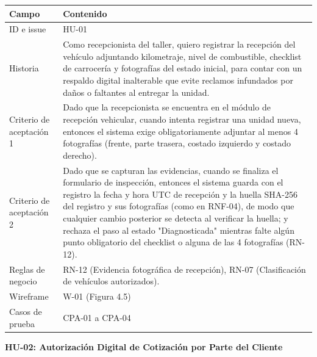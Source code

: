 {\def\LTcaptype{none} %
\begin{longtable}[]{@{}
  >{\raggedright\arraybackslash}p{}
  >{\raggedright\arraybackslash}p{}@{}}
\toprule\noalign{}
\begin{minipage}[b]{\linewidth}\raggedright
\textbf{Campo}
\end{minipage} & \begin{minipage}[b]{\linewidth}\raggedright
\textbf{Contenido}
\end{minipage} \\
\midrule\noalign{}
\endhead
\bottomrule\noalign{}
\endlastfoot
ID e issue & HU-01 \\
Historia & Como recepcionista del taller, quiero registrar la recepción
del vehículo adjuntando kilometraje, nivel de combustible, checklist de
carrocería y fotografías del estado inicial, para contar con un respaldo
digital inalterable que evite reclamos infundados por daños o faltantes
al entregar la unidad. \\
Criterio de aceptación 1 & Dado que la recepcionista se encuentra en el
módulo de recepción vehicular, cuando intenta registrar una unidad
nueva, entonces el sistema exige obligatoriamente adjuntar al menos 4
fotografías (frente, parte trasera, costado izquierdo y costado
derecho). \\
Criterio de aceptación 2 & Dado que se capturan las evidencias, cuando
se finaliza el formulario de inspección, entonces el sistema guarda con
el registro la fecha y hora UTC de recepción y la huella SHA-256 del
registro y sus fotografías (como en RNF-04), de modo que cualquier
cambio posterior se detecta al verificar la huella; y rechaza el paso
al estado "Diagnosticada" mientras falte algún punto obligatorio del
checklist o alguna de las 4 fotografías (RN-12). \\
Reglas de negocio & RN-12 (Evidencia fotográfica de recepción), RN-07
(Clasificación de vehículos autorizados). \\
Wireframe & W-01 (Figura 4.5) \\
Casos de prueba & CPA-01 a CPA-04 \\
\end{longtable}
}

\textbf{HU-02: Autorización Digital de Cotización por Parte del Cliente}

